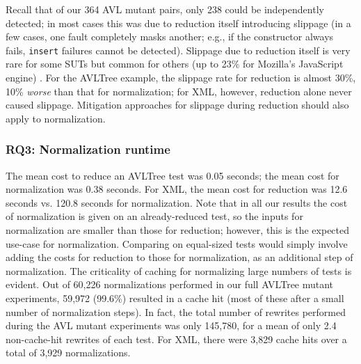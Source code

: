 Recall that of our 364 AVL mutant pairs, only 238 could be
independently detected; in most cases this was due to reduction itself
introducing slippage (in a few cases, one fault completely masks
another; e.g., if the constructor always fails, {\tt insert} failures
cannot be detected).  Slippage due to reduction itself is very rare for some SUTs but common
for others (up to 23\% for Mozilla's JavaScript engine)
\cite{PLDI13}.  For the AVLTree example, the slippage rate for
reduction is almost 30\%, 10\% \emph{worse} than that for
normalization; for XML, however, reduction alone never caused slippage.  Mitigation
approaches for slippage during reduction \cite{slippage} should also
apply to normalization.

\subsubsection{RQ3: Normalization runtime}

The mean cost to reduce an AVLTree test was 0.05 seconds; the mean cost for normalization was 0.38
seconds.   For XML, the mean cost for reduction was 12.6 seconds vs.
120.8 seconds for normalization.  Note that in all our results the cost of normalization is given on an
already-reduced test, so the inputs for normalization are smaller than
those for reduction; however, this is the expected use-case for
normalization.  Comparing on equal-sized tests would simply involve
adding the costs for reduction to those for normalization, as an
additional step of normalization.  The criticality of caching
for normalizing large numbers of tests is evident.  Out of 60,226
normalizations performed in our full AVLTree mutant experiments,
59,972 (99.6\%) resulted in a cache hit (most of these after a small
number of normalization steps).  In fact, the total number of rewrites
performed during the AVL mutant experiments was only 145,780, for a mean of only
2.4 non-cache-hit rewrites of each test.  For XML, there were 3,829 cache hits over
a total of 3,929 normalizations.

